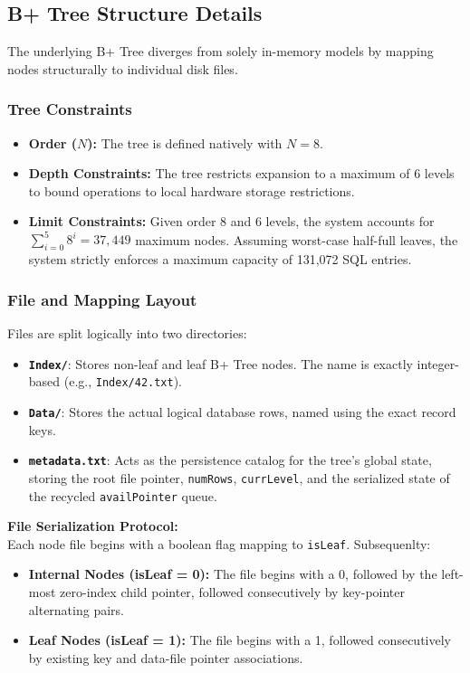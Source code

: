 \documentclass[12pt, a4paper]{article}
\begin{document}
\subsection{B+ Tree Structure Details}
The underlying B+ Tree diverges from solely in-memory models by mapping nodes structurally to individual disk files.

\subsubsection{Tree Constraints}
\begin{itemize}
    \item \textbf{Order ($N$):} The tree is defined natively with $N=8$.
    \item \textbf{Depth Constraints:} The tree restricts expansion to a maximum of 6 levels to bound operations to local hardware storage restrictions.
    \item \textbf{Limit Constraints:} Given order 8 and 6 levels, the system accounts for $\sum_{i=0}^{5} 8^i = 37,449$ maximum nodes. Assuming worst-case half-full leaves, the system strictly enforces a maximum capacity of 131,072 SQL entries.
\end{itemize}

\subsubsection{File and Mapping Layout}
Files are split logically into two directories:
\begin{itemize}
    \item \textbf{\texttt{Index/}}: Stores non-leaf and leaf B+ Tree nodes. The name is exactly integer-based (e.g., \texttt{Index/42.txt}). 
    \item \textbf{\texttt{Data/}}: Stores the actual logical database rows, named using the exact record keys.
    \item \textbf{\texttt{metadata.txt}}: Acts as the persistence catalog for the tree's global state, storing the root file pointer, \texttt{numRows}, \texttt{currLevel}, and the serialized state of the recycled \texttt{availPointer} queue.
\end{itemize}

\textbf{File Serialization Protocol:}\\
Each node file begins with a boolean flag mapping to \texttt{isLeaf}. Subsequenlty:
\begin{itemize}
    \item \textbf{Internal Nodes (isLeaf = 0):} The file begins with a 0, followed by the left-most zero-index child pointer, followed consecutively by key-pointer alternating pairs.
    \item \textbf{Leaf Nodes (isLeaf = 1):} The file begins with a 1, followed consecutively by existing key and data-file pointer associations.
\end{itemize}
\end{document}
